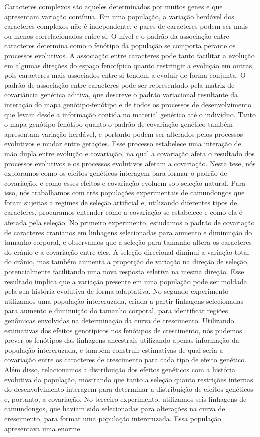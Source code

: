 Caracteres complexos são aqueles determinados por muitos genes e que apresentam variação contínua. Em uma população, a variação herdável dos caracteres complexos não é independente, e pares de caracteres podem ser mais ou menos correlacionados entre si. O nível e o padrão da associação entre caracteres determina como o fenótipo da população se comporta perante os processos evolutivos. A associação entre caracteres pode tanto facilitar a evolução em algumas direções do espaço fenotípico quanto restringir a evolução em outras, pois caracteres mais associados entre si tendem a evoluir de forma conjunta. O padrão de associação entre caracteres pode ser representado pela matriz de covariância genética aditiva, que descreve o padrão variacional resultante da interação do mapa genótipo-fenótipo e de todos os processos de desenvolvimento que levam desde a informação contida no material genético até o indivíduo. Tanto o mapa genótipo-fenótipo quanto o padrão de covariação genético também apresentam variação herdável, e portanto podem ser alterados pelos processos evolutivos e mudar entre gerações. Esse processo estabelece uma interação de mão dupla entre evolução e covariação, na qual a covariação afeta o resultado dos processos evolutivos e os processos evolutivos afetam a covariação. Nesta tese, nós exploramos como os efeitos genéticos interagem para formar o padrão de covariação, e como esses efeitos e covariação evoluem sob seleção natural. Para isso, nós trabalhamos com três populações experimentais de camundongos que foram sujeitas a regimes de seleção artificial e, utilizando diferentes tipos de caracteres, procuramos entender como a covariação se estabelece e como ela é afetada pela seleção. No primeiro experimento, estudamos o padrão de covariação de caracteres cranianos em linhagens selecionadas para aumento e diminuição do tamanho corporal, e observamos que a seleção para tamanho altera os caracteres do crânio e a covariação entre eles. A seleção direcional diminui a variação total do crânio, mas também aumenta a proporção de variação na direção de seleção, potencialmente facilitando uma nova resposta seletiva na mesma direção. Esse resultado implica que a variação presente em uma população pode ser moldada pela sua história evolutiva de forma adaptativa. No segundo experimento utilizamos uma população intercruzada, criada a partir linhagens selecionadas para aumento e diminuição do tamanho corporal, para identificar regiões genômicas envolvidas na determinação da curva de crescimento. Utilizando estimativas dos efeitos genotípicos nos fenótipos de crescimento, nós pudemos prever os fenótipos das linhagens ancestrais utilizando apenas informação da população intercruzada, e também construir estimativas de qual seria a covariação entre os caracteres de crescimento para cada tipo de efeito genético. Além disso, relacionamos a distribuição dos efeitos genéticos com a história evolutiva da população, mostrando que tanto a seleção quanto restrições internas do desenvolvimento interagem para determinar a distribuição de efeitos genéticos e, portanto, a covariação. No terceiro experimento, utilizamos seis linhagens de camundongos, que haviam sido selecionadas para alterações na curva de crescimento, para formar uma população intercruzada. Essa população apresentava uma enorme 